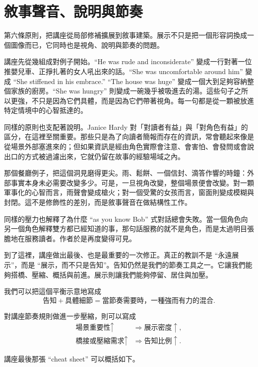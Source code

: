 \section{敘事聲音、說明與節奏}

第六條原則，把講座從局部修補擴展到敘事建築。展示不只是把一個形容詞換成一個圖像而已，它同時也是視角、說明與節奏的問題。

講座先從幾組成對例子開始。``He was rude and inconsiderate'' 變成一行對著一位推嬰兒車、正掙扎著的女人吼出來的話。``She was uncomfortable around him'' 變成 ``She stiffened in his embrace.'' ``The house was huge'' 變成一個大到足夠容納整個家族的廚房。``She was hungry'' 則變成一碗幾乎被吸進去的湯。這些句子之所以更強，不只是因為它們具體，而是因為它們帶著視角。每一句都是從一顆被放進特定情境中的心智抵達的。

同樣的原則也支配著說明。Janice Hardy 對「對讀者有益」與「對角色有益」的區分，在這裡至關重要。那些只是為了向讀者簡報而存在的資訊，常會聽起來像是從場景外部塞進來的；但如果資訊是經由角色實際會注意、會害怕、會發問或會說出口的方式被過濾出來，它就仍留在故事的經驗場域之內。

那個餐廳例子，把這個洞見磨得更尖。雨、鬆餅、一個信封、滴答作響的時鐘：外部事實本身未必需要改變多少。可是，一旦視角改變，整個場景便會改變。對一顆軍事化的心智而言，雨聲會變成槍火；對一個受驚的女孩而言，窗面則變成模糊與封閉。這不是修飾性的差別，而是敘事聲音在做結構性工作。

同樣的壓力也解釋了為什麼 ``as you know Bob'' 式對話總會失敗。當一個角色向另一個角色解釋雙方都已經知道的事，那句話服務的就不是角色，而是太過明目張膽地在服務讀者。作者於是再度變得可見。

到了這裡，講座做出最後、也是最重要的一次修正。真正的教訓不是 ``永遠展示''，而是 ``展示，而不只是告知''。告知仍然是我們的節奏工具之一。它讓我們能夠搭橋、壓縮、概括與前進。展示則讓我們能夠停留、居住與加壓。

我們可以把這個平衡示意地寫成
\begin{equation}
\text{告知} + \text{具體細節} = \text{當節奏需要時，一種強而有力的混合}.
\end{equation}

對講座節奏規則做進一步壓縮，則可以寫成
\begin{align}
\text{場景重要性} \uparrow &\Rightarrow \text{展示密度} \uparrow,\\
\text{橋接或壓縮需求} \uparrow &\Rightarrow \text{告知比例} \uparrow.
\end{align}

講座最後那張 ``cheat sheet'' 可以概括如下。

